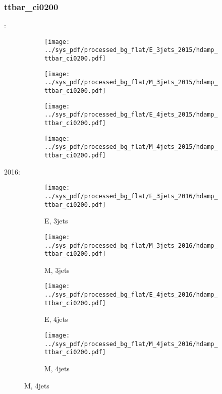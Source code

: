 \documentclass{beamer}
\begin{document}
\begin{frame}
\frametitle{ttbar_ci0200}
\fontsize{5}{1}:
\begin{figure}
\centering
\begin{subfigure}[b]{0.24\textwidth}
\texttt{[image: ../sys\_pdf/processed\_bg\_flat/E\_3jets\_2015/hdamp\_ttbar\_ci0200.pdf]}
\end{subfigure}
\begin{subfigure}[b]{0.24\textwidth}
\texttt{[image: ../sys\_pdf/processed\_bg\_flat/M\_3jets\_2015/hdamp\_ttbar\_ci0200.pdf]}
\end{subfigure}
\begin{subfigure}[b]{0.24\textwidth}
\texttt{[image: ../sys\_pdf/processed\_bg\_flat/E\_4jets\_2015/hdamp\_ttbar\_ci0200.pdf]}
\end{subfigure}
\begin{subfigure}[b]{0.24\textwidth}
\texttt{[image: ../sys\_pdf/processed\_bg\_flat/M\_4jets\_2015/hdamp\_ttbar\_ci0200.pdf]}
\end{subfigure}
\end{figure}
2016:
\begin{figure}
\centering
\begin{subfigure}[b]{0.24\textwidth}
\texttt{[image: ../sys\_pdf/processed\_bg\_flat/E\_3jets\_2016/hdamp\_ttbar\_ci0200.pdf]}
\captionsetup{font=tiny}
\caption{E, 3jets}
\end{subfigure}
\begin{subfigure}[b]{0.24\textwidth}
\texttt{[image: ../sys\_pdf/processed\_bg\_flat/M\_3jets\_2016/hdamp\_ttbar\_ci0200.pdf]}
\captionsetup{font=tiny}
\caption{M, 3jets}
\end{subfigure}
\begin{subfigure}[b]{0.24\textwidth}
\texttt{[image: ../sys\_pdf/processed\_bg\_flat/E\_4jets\_2016/hdamp\_ttbar\_ci0200.pdf]}
\captionsetup{font=tiny}
\caption{E, 4jets}
\end{subfigure}
\begin{subfigure}[b]{0.24\textwidth}
\texttt{[image: ../sys\_pdf/processed\_bg\_flat/M\_4jets\_2016/hdamp\_ttbar\_ci0200.pdf]}
\captionsetup{font=tiny}
\caption{M, 4jets}
\end{subfigure}
\end{figure}
\end{frame}
\end{document}
